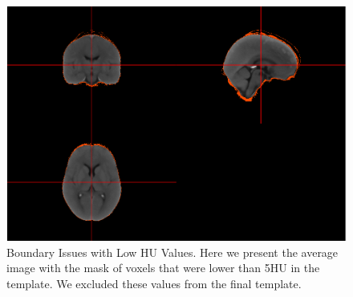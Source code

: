 \documentclass[]{elsarticle} %
\makeatletter
\def\maxwidth{\ifdim\Gin@nat@width>\linewidth\linewidth
\else\Gin@nat@width\fi}
\let\Oldincludegraphics\includegraphics
\renewcommand{\includegraphics}[1]{\Oldincludegraphics[width=\maxwidth]{#1}}
\makeatother
\begin{document}
\begin{figure}
\centering
\includegraphics{index_files/figure-latex/boundary-1.pdf}
\caption{\label{fig:boundary}Boundary Issues with Low HU Values. Here we present the average image with the mask of voxels that were lower than 5HU in the template. We excluded these values from the final template.}
\end{figure}
\end{document}
